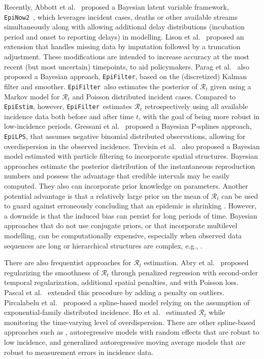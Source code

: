 \documentclass[10pt,letterpaper]{article}
\def\EpiEstim{\texttt{EpiEstim}}
\def\EpiLPS{\texttt{EpiLPS}}
\def\EpiFilter{\texttt{EpiFilter}}
\def\EpiNow2{\texttt{EpiNow2}}
\def\calR{\mathcal{R}}
\begin{document}
Recently, Abbott et al.~\cite{abbott2020estimating} proposed a Bayesian latent
variable framework, \EpiNow2~\cite{EpiNow2}, which leverages incident cases,
deaths or other available streams simultaneously along with allowing additional
delay distributions (incubation period and onset to reporting delays) in
modelling. Lison et al.~\cite{lison2024generative} proposed an extension that
handles missing data by imputation followed by a truncation adjustment. These
modifications are intended to increase accuracy at the most recent (but most
uncertain) timepoints, to aid policymakers. Parag et
al.~\cite{parag2021improved} also proposed a Bayesian approach, \EpiFilter,
based on the (discretized) Kalman filter and smoother. \EpiFilter\ also
estimates the posterior of $\calR_t$ given using a Markov model for $\calR_t$
and Poisson distributed incident cases. Compared to \EpiEstim, however,
\EpiFilter\ estimates $\calR_t$ retrospectively using all available incidence
data both before and after time $t$, with the goal of being more robust in
low-incidence periods. Gressani et al.~\cite{gressani2022epilps} proposed a
Bayesian P-splines approach, \EpiLPS, that assumes negative binomial distributed
observations, allowing for overdispersion in the observed incidence. Trevisin et
al.~\cite{trevisin2023spatially} also proposed a Bayesian model estimated with
particle filtering to incorporate spatial structures. Bayesian approaches
estimate the posterior distribution of the instantaneous reproduction numbers
and possess the advantage that credible intervals may be easily computed. They
also can incorporate prior knowledge on parameters. Another potential advantage
is that a relatively large prior on the mean of $\calR_t$ can be used to guard
against erroneously concluding that an epidemic is shrinking
\cite{thompson2019improved}. However, a downside is that the induced bias can
persist for long periods of time. Bayesian approaches that do not use conjugate
priors, or that incorporate multilevel modelling, can be computationally
expensive, especially when observed data sequences are long or hierarchical
structures are complex, e.g., \cite{abbott2020estimating}. 


There are also frequentist approaches for $\calR_t$ estimation. Abry et
al.~\cite{abry2020spatial} proposed regularizing the smoothness of $\calR_t$
through penalized regression with second-order temporal regularization,
additional spatial penalties, and with Poisson loss. Pascal et
al.~\cite{pascal2022nonsmooth} extended this procedure by adding a penalty on
outliers. Pircalabelu et al.~\cite{pircalabelu2023spline} proposed a
spline-based model relying on the assumption of exponential-family distributed
incidence. Ho et al.~\cite{ho2023accounting} estimated $\calR_t$ while
monitoring the time-varying level of overdispersion. There are other
spline-based approaches such as
\cite{azmon2014estimation,gressani2021approximate}, autoregressive models with
random effects \cite{jin2023epimix} that are robust to low incidence, and
generalized autoregressive moving average models \cite{hettinger2023estimating}
that are robust to measurement errors in incidence data. 
\end{document}
